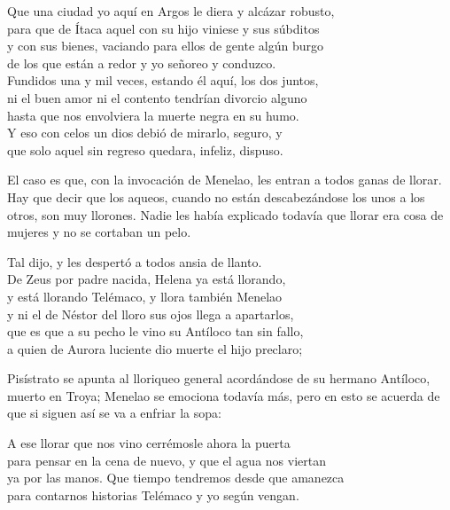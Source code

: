 \begin{versocita}
Que una ciudad yo aquí en Argos le diera y alcázar robusto,\\
para que de Ítaca aquel con su hijo viniese y sus súbditos\\
y con sus bienes, vaciando para ellos de gente algún burgo\\
de los que están a redor y yo señoreo y conduzco.\\
Fundidos una y mil veces, estando él aquí, los dos juntos,\\
ni el buen amor ni el contento tendrían divorcio alguno\\
hasta que nos envolviera la muerte negra en su humo.\\
Y eso con celos un dios debió de mirarlo, seguro, y\\
que solo aquel sin regreso quedara, infeliz, dispuso.
\end{versocita}

El caso es que, con la invocación de Menelao, les entran a todos ganas de llorar.
Hay que decir que los aqueos, cuando no están descabezándose los unos a los otros, son muy llorones. Nadie les había explicado todavía que llorar era cosa de mujeres y no se cortaban un pelo.

\begin{versocita}
Tal dijo, y les despertó a todos ansia de llanto.\\
De Zeus por padre nacida, Helena ya está llorando,\\
y está llorando Telémaco, y llora también Menelao\\
y ni el de Néstor del lloro sus ojos llega a apartarlos,\\
que es que a su pecho le vino su Antíloco tan sin fallo,\\
a quien de Aurora luciente dio muerte el hijo preclaro;
\end{versocita}

Pisístrato se apunta al lloriqueo general acordándose de su hermano Antíloco, muerto en Troya; Menelao se emociona todavía más, pero en esto se acuerda de que si siguen así se va a enfriar la sopa:

\begin{versocita}
A ese llorar que nos vino cerrémosle ahora la puerta\\
para pensar en la cena de nuevo, y que el agua nos viertan\\
ya por las manos. Que tiempo tendremos desde que amanezca\\
para contarnos historias Telémaco y yo según vengan.
\end{versocita}

